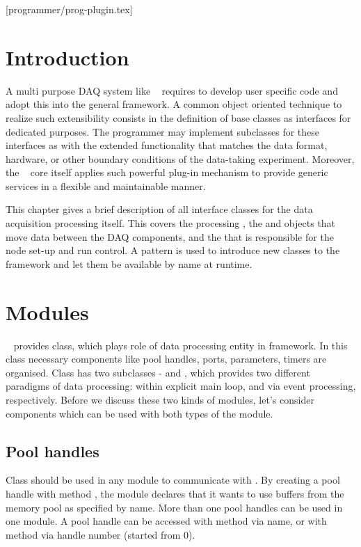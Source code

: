 [programmer/prog-plugin.tex]
\section{Introduction}
A multi purpose DAQ system like \dabc~ requires to develop user specific code and adopt
this into the general framework. A common object oriented technique to realize such
extensibility consists in the definition of base classes as interfaces for dedicated purposes.
The programmer may implement subclasses for these interfaces as 
with the extended functionality that matches the data format, hardware, or other boundary conditions of the
data-taking experiment. Moreover, the  \dabc~ core itself applies such powerful plug-in mechanism to provide 
generic services in a flexible and maintainable manner.   

This chapter gives a brief description of all interface classes for the data acquisition 
processing itself. This covers the processing , the  and 
 objects that move data between the DAQ components, 
and the  that is responsible for the node set-up and run control.
A  pattern is used to introduce new classes to the framework and let them
be available by name at runtime.


\section{Modules}

\dabc~ provides  class, which plays role of data processing entity in framework. 
In this class necessary components like pool handles, ports, parameters, timers are organised.
Class  has two subclasses -  and ,
which provides two different paradigms of data processing: 
within explicit main loop, and via event processing, respectively.
Before we discuss these two kinds of modules, 
let's consider components which can be used with both types of the module.


\subsection{Pool handles}

Class  should be used in any module to communicate with .
By creating a pool handle with method , 
the module declares that it 
wants to use buffers from the memory pool as specified by name. 
More than one pool handles can be used in one module. 
A pool handle can be accessed with method  via name,
or with method  via handle number (started from 0).

